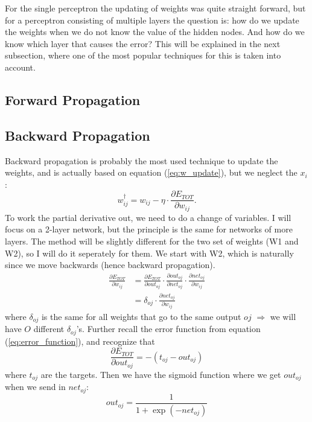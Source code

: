 \documentclass[norsk,a4paper,12pt]{article}
\begin{document}
For the single perceptron the updating of weights was quite straight forward, but for a perceptron consisting of multiple layers the question is: how do we update the weights when we do not know the value of the hidden nodes. And how do we know which layer that causes the error? This will be explained in the next subsection, where one of the most popular techniques for this is taken into account.

\subsection{Forward Propagation}

\subsection{Backward Propagation}
Backward propagation is probably the most used technique to update the weights, and is actually based on equation (\ref{eq:w_update}), but we neglect the $x_i$:
\begin{equation}
w_{ij}^{\dagger}=w_{ij} - \eta\cdot \frac{\partial E_{TOT}}{\partial w_{ij}}.
\end{equation}
To work the partial derivative out, we need to do a change of variables. I will focus on a 2-layer network, but the principle is the same for networks of more layers. The method will be slightly different for the two set of weights (W1 and W2), so I will do it seperately for them. We start with W2, which is naturally since we move backwards (hence backward propagation). 
\begin{align}
\frac{\partial E_{TOT}}{\partial w_{ij}}&=\frac{\partial E_{TOT}}{\partial out_{oj}}\cdot\frac{\partial out_{oj}}{\partial net_{oj}}\cdot\frac{\partial net_{oj}}{\partial w_{ij}}\\
&=\delta_{oj}\cdot\frac{\partial net_{oj}}{\partial w_{ij}}
\end{align}
where $\delta_{oj}$ is the same for all weights that go to the same output $oj$ $\Rightarrow$ we will have $O$ different $\delta_{oj}$'s. Further recall the error function from equation (\ref{eq:error_function}), and recognize that
\begin{equation}
\frac{\partial E_{TOT}}{\partial out_{oj}}=-(t_{oj}-out_{oj})
\end{equation}
where $t_{oj}$ are the targets. Then we have the sigmoid function where we get $out_{oj}$ when we send in $net_{oj}$:
\begin{equation}
out_{oj}=\frac{1}{1+\exp(-net_{oj})}
\end{equation}
\end{document}

